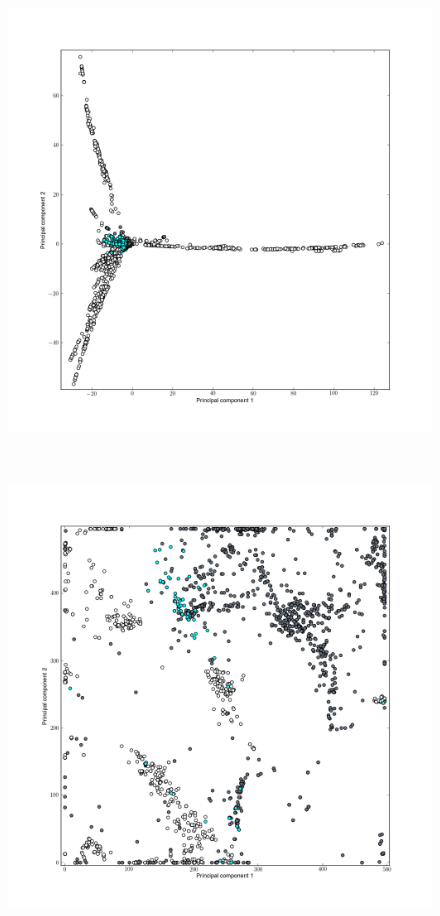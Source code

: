 \begin{figure}[H]
\begin{minipage}{0.50\textwidth}
	\includegraphics[trim=3cm 3cm 2cm 2cm,clip, width=\textwidth]{./img/ISOMAP.png}
	\label{figISOMAP}
	\end{minipage}
	\\
	\begin{minipage}{0.50\textwidth}
	\includegraphics[trim=3cm 3cm 2cm 2cm,clip, width=\textwidth]{./img/SOM2.png}

\end{minipage}
\end{figure}
